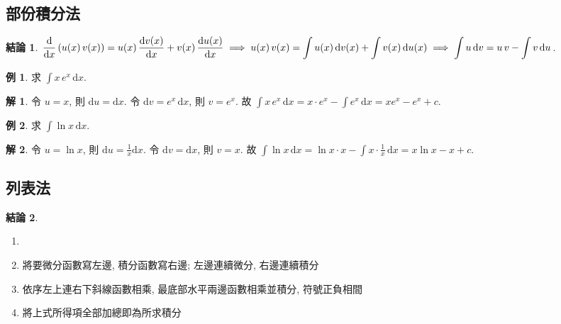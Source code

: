 \documentclass[12pt]{extarticle}
\newcommand{\ds}{\displaystyle}
\newcommand{\ie}{\;\Longrightarrow\;}
\theoremstyle{definition}
\newtheorem*{fact}{結論}
\newtheorem*{ex}{例}
\newtheorem*{sol}{解}
\begin{document}
\subsection*{部份積分法}

\begin{fact}
  $\ds\frac{\mathrm{d}}{\mathrm{d}x}\,(u(x)\,v(x)) = u(x)\,\frac{\mathrm{d}v(x)}{\mathrm{d}x} + v(x)\,\frac{\mathrm{d}u(x)}{\mathrm{d}x}\ie u(x)\,v(x) = \int u(x)\,\mathrm{d}v(x) + \int v(x)\,\mathrm{d}u(x) \\ \ie \int u\,\text{d}v = u\,v - \int v\,\text{d}u$. 
\end{fact}

\begin{ex}
  求 $\ds\int x\, e^{x}\,\mathrm{d}x$. 
\end{ex}

\begin{sol}
  令 $u = x$, 則 $\ds\mathrm{d}u = \mathrm{d}x$. 令 $\ds\mathrm{d}v = e^x\,\mathrm{d}x$, 則 $\ds v = e^x$. 故 $\ds\int x\, e^{x}\,\mathrm{d}x = x\cdot e^x - \int e^x\,\mathrm{d}x = xe^x - e^x + c$. 
\end{sol}
    
\begin{ex}
  求 $\ds\int\!\ln x\,\mathrm{d}x$. 
\end{ex}

\begin{sol}
  令 $\ds u = \ln x$, 則 $\ds\mathrm{d}u = \frac{1}{x}\mathrm{d}x$. 令 $\ds\mathrm{d}v = \mathrm{d}x$, 則 $v = x$. 故 $\ds\int\!\ln x\,\mathrm{d}x = \ln x \cdot x - \int x\cdot\frac{1}{x}\,\mathrm{d}x = x\ln x - x + c$. 
\end{sol}

\subsection*{列表法}

\begin{fact}
  \begin{enumerate}\setlength{\itemsep}{0pt}
    \item[]
    \item 將要微分函數寫左邊, 積分函數寫右邊; 左邊連續微分, 右邊連續積分
    \item 依序左上連右下斜線函數相乘, 最底部水平兩邊函數相乘並積分, 符號正負相間
    \item 將上式所得項全部加總即為所求積分
  \end{enumerate}
\end{fact}
\end{document}
